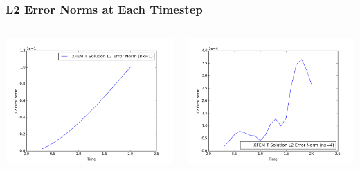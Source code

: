 \documentclass[]{beamer}
\begin{document}
\begin{frame}[t]\frametitle{L2 Error Norms at Each Timestep}
  	\begin{columns}
			\begin{center}
			\includegraphics[scale=0.3]{figures/1D_rz_h1m/1D_rz_homog1mat_nx1_L2_Errs}
			\end{center}
			\begin{center}
			\includegraphics[scale=0.3]{figures/1D_rz_h1m/1D_rz_homog1mat_nx4_L2_Errs}
			\end{center}
	\end{columns}
\end{frame}
\end{document}

